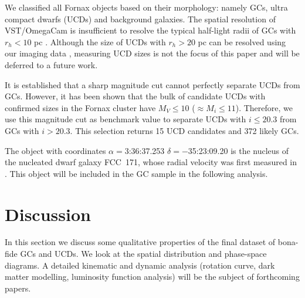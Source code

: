 \documentclass[useAMS,usenatbib]{mn2e}
\newcommand{\kms}{\mbox{\,km~s$^{-1}$}}
\begin{document}
We classified all Fornax objects based on their morphology: namely GCs, ultra 
compact dwarfs (UCDs) and background galaxies. The spatial resolution of 
VST/OmegaCam is insufficient to resolve the typical half-light radii of GCs 
with $r_h < 10$ pc \citep{Masters, Puzia14}. Although the size of UCDs with 
$r_h > 20$ pc can be resolved using our imaging data \citep{Cantiello15}, 
measuring UCD sizes is not the focus of this paper and will be deferred to a 
future work.

It is established that a sharp magnitude cut cannot perfectly separate UCDs 
from GCs. However, it has been shown \citep{Voggel16, 
Eigenthaler18} that the bulk of candidate UCDs with confirmed sizes in the Fornax cluster 
have $M_V \le 10$ ($\approx M_i \le 11$). 
Therefore, we use this magnitude cut as benchmark value to separate UCDs with 
$i \le 20.3$ from GCs with $i > 20.3$. This selection returns 15 UCD candidates 
and 372 likely GCs. 

The object with coordinates $\alpha=$3:36:37.253 $\delta=-$35:23:09.20 is the nucleus of the 
nucleated dwarf galaxy FCC~171, whose radial velocity was first measured in 
\citet{Bergond07}. This object will be included in the GC sample in the following 
analysis.  

\section{Discussion}
\label{sec:discussion}
In this section we discuss some qualitative properties of the final dataset 
of bona-fide GCs and UCDs. We look at the spatial distribution and 
phase-space diagrams. A detailed kinematic and dynamic analysis 
(rotation curve, dark matter modelling, luminosity function analysis) will 
be the subject of forthcoming papers.
\end{document}
